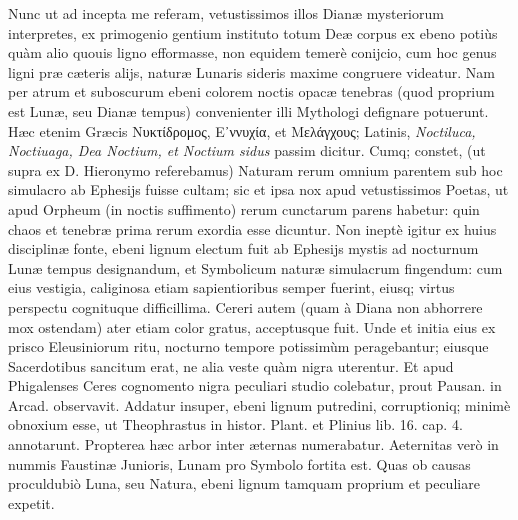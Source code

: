 \documentclass[a4paper, 11pt, oneside, polutonikogreek, latin]{article}
\begin{document}
Nunc ut ad incepta me referam, vetustissimos illos Dianæ mysteriorum interpretes, ex primogenio gentium instituto totum Deæ corpus ex ebeno potiùs quàm alio quouis ligno efformasse, non equidem temerè conijcio, cum hoc genus ligni præ cæteris alijs, naturæ Lunaris sideris maxime congruere videatur. Nam per atrum et suboscurum ebeni colorem noctis opacæ tenebras (quod proprium est Lunæ, seu Dianæ tempus) convenienter illi Mythologi defignare potuerunt. Hæc etenim Græcis Νυκτίδρομος, Ε᾽ννυχία, et Μελάγχους; Latinis, \emph{Noctiluca, Noctiuaga, Dea Noctium, et Noctium sidus} passim dicitur. Cumq; constet, (ut supra ex D. Hieronymo referebamus) Naturam rerum omnium parentem sub hoc simulacro ab Ephesijs fuisse cultam; sic et ipsa nox apud vetustissimos Poetas, ut apud Orpheum (in noctis suffimento) rerum cunctarum parens habetur: quin chaos et tenebræ prima rerum exordia esse dicuntur. Non ineptè igitur ex huius disciplinæ fonte, ebeni lignum electum fuit ab Ephesijs mystis ad nocturnum Lunæ tempus designandum, et Symbolicum naturæ simulacrum fingendum: cum eius vestigia, caliginosa etiam sapientioribus semper fuerint, eiusq; virtus perspectu cognituque difficillima. Cereri autem (quam à Diana non abhorrere mox ostendam) ater etiam color gratus, acceptusque fuit. Unde et initia eius ex prisco Eleusiniorum ritu, nocturno tempore potissimùm peragebantur; eiusque Sacerdotibus sancitum erat, ne alia veste quàm nigra uterentur. Et apud Phigalenses Ceres cognomento nigra peculiari studio colebatur, prout Pausan. in Arcad. observavit. Addatur insuper, ebeni lignum putredini, corruptioniq; minimè obnoxium esse, ut Theophrastus in histor. Plant. et Plinius lib. 16. cap. 4. annotarunt. Propterea hæc arbor inter æternas numerabatur. Aeternitas verò in nummis Faustinæ Junioris, Lunam pro Symbolo fortita est. Quas ob causas proculdubiò Luna, seu Natura, ebeni lignum tamquam proprium et peculiare expetit.
\end{document}
